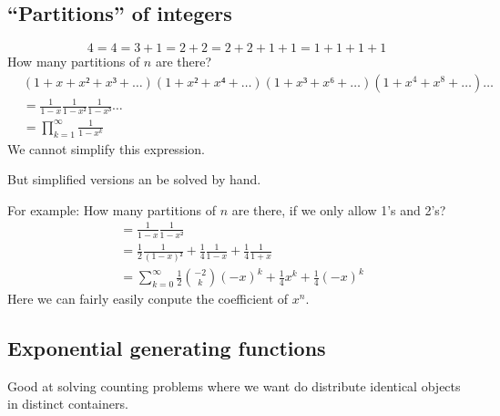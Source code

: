 \documentclass[english]{lbscript}
\begin{document}
\subsection{\enquote{Partitions} of integers}
\begin{equation}
	\label{eq:42}
	4 = 4 = 3+1=2+2=2+2+1+1=1+1+1+1
\end{equation}
How many partitions of \(n\) are there?
\begin{align}
	\label{eq:43}
	 & \left(1+x+x²+x³+\dots \right) \left(1+x²+x⁴+\dots \right) \left(1+x³+x⁶+\dots \right) \left(1+x^{4}+x^{8}+\dots \right) \dots \\
	 & = \frac{1}{1-x} \frac{1}{1-x²} \frac{1}{1-x³}\dots                                                                            \\
	 & = \prod_{k=1}^{∞} \frac{1}{1-x^{k}}
\end{align}
We cannot simplify this expression.

But simplified versions an be solved by hand.

For example: How many partitions of \(n\) are there, if we only allow 1's and 2's?
\begin{align}
	\label{eq:44}
	 & = \frac{1}{1-x} \frac{1}{1-x²}                                                             \\
	 & = \frac{1}{2} \frac{1}{(1-x)²} + \frac{1}{4} \frac{1}{1-x} + \frac{1}{4} \frac{1}{1+x}     \\
	 & = ∑_{k=0}^{∞} \frac{1}{2} \binom{-2}{k} (-x)^{k} + \frac{1}{4} x^{k} + \frac{1}{4}(-x)^{k}
\end{align}
Here we can fairly easily conpute the coefficient of \(x^{n}\).


\subsection{Exponential generating functions}
\label{sec:expon-gener-funct}

Good at solving counting problems where we want do distribute identical objects in distinct containers.
\end{document}
